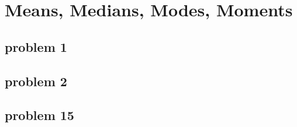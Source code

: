 \section{Means, Medians, Modes, Moments}

\subsection{problem 1}

\subsection{problem 2}

\subsection{problem 15}

